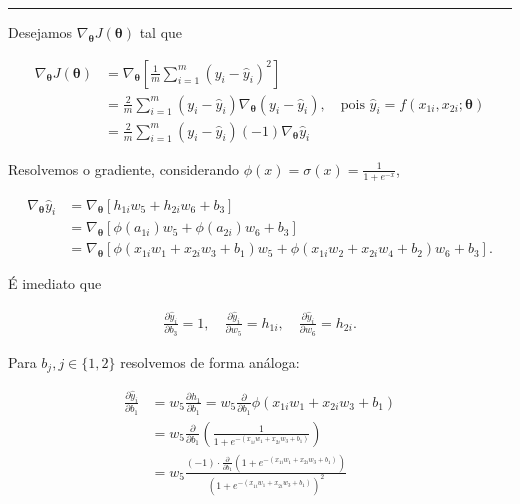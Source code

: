 \documentclass[
  a4paperpaper,
]{article}
\begin{document}
\begin{center}\rule{0.5\linewidth}{0.5pt}\end{center}

Desejamos \(\nabla_{\boldsymbol{\theta}}J(\boldsymbol{\theta})\) tal que

\begin{align}
  \nabla_{\boldsymbol{\theta}}J(\boldsymbol{\theta}) &= \nabla_{\boldsymbol{\theta}} \left[ \frac{1}{m} \sum\limits^m_{i = 1} (y_i - \hat{y}_i)^2 \right] \nonumber \\
  &= \frac{2}{m} \sum\limits^m_{i = 1} (y_i - \hat{y}_i) \nabla_{\boldsymbol{\theta}} (y_i - \hat{y}_i), \quad \text{pois } \hat{y}_i = f(x_{1i}, x_{2i}; \boldsymbol{\theta}) \nonumber \\
  &= \frac{2}{m} \sum\limits^m_{i = 1} (y_i - \hat{y}_i) (-1) \nabla_{\boldsymbol{\theta}} \hat{y}_i \label{101}
\end{align}

Resolvemos o gradiente, considerando
\(\phi(x) = \sigma(x) = \frac{1}{1+ e^{-x}}\),

\begin{align*}
  \nabla_{\boldsymbol{\theta}} \hat{y}_i &= \nabla_{\boldsymbol{\theta}} \left[ h_{1i} w_5 + h_{2i} w_6 + b_3 \right] \\
  &= \nabla_{\boldsymbol{\theta}} \left[ \phi(a_{1i}) w_5 + \phi(a_{2i}) w_6 + b_3 \right] \\
  &= \nabla_{\boldsymbol{\theta}} \left[ \phi(x_{1i} w_1 + x_{2i} w_3 + b_1) w_5 + \phi(x_{1i} w_2 + x_{2i} w_4 + b_2) w_6 + b_3 \right].
\end{align*}

É imediato que

\begin{align*}
  \frac{\partial \hat{y}_i}{\partial b_3} = 1, \quad \frac{\partial \hat{y}_i}{\partial w_5} = h_{1i}, \quad \frac{\partial \hat{y}_i}{\partial w_6} = h_{2i}.
\end{align*}

Para \(b_j, j \in \{1, 2\}\) resolvemos de forma análoga:

\begin{align*}
\frac{\partial \hat{y}_i}{\partial b_1} &= w_5 \frac{\partial h_1}{\partial b_1} = w_5 \frac{\partial}{\partial b_1} \phi(x_{1i} w_1 + x_{2i} w_3 + b_1) \\  
&= w_5 \frac{\partial}{\partial b_1} \left( \frac{1}{1+ e^{-(x_{1i} w_1 + x_{2i} w_3 + b_1)}} \right) \\  
&= w_5 \frac{(-1) \cdot \frac{\partial}{\partial b_1} \left(1+ e^{-(x_{1i} w_1 + x_{2i} w_3 + b_1)} \right)}{\left(1+ e^{-(x_{1i} w_1 + x_{2i} w_3 + b_1)} \right)^2}
\end{align*}
\end{document}
